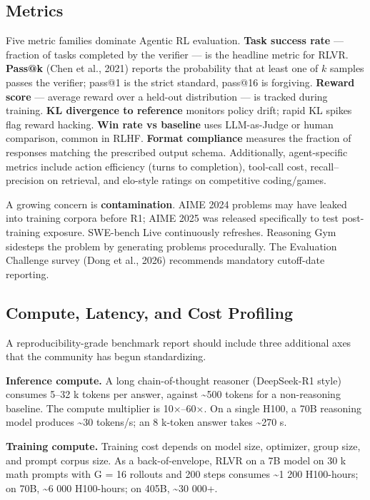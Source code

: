 \subsection{Metrics}\label{metrics}

Five metric families dominate Agentic RL evaluation. \textbf{Task success rate} --- fraction of tasks completed by the verifier --- is the headline metric for RLVR. \textbf{Pass@k} (Chen et al., 2021) reports the probability that at least one of \(k\) samples passes the verifier; pass@1 is the strict standard, pass@16 is forgiving. \textbf{Reward score} --- average reward over a held-out distribution --- is tracked during training. \textbf{KL divergence to reference} monitors policy drift; rapid KL spikes flag reward hacking. \textbf{Win rate vs baseline} uses LLM-as-Judge or human comparison, common in RLHF. \textbf{Format compliance} measures the fraction of responses matching the prescribed output schema. Additionally, agent-specific metrics include action efficiency (turns to completion), tool-call cost, recall--precision on retrieval, and elo-style ratings on competitive coding/games.

A growing concern is \textbf{contamination}. AIME 2024 problems may have leaked into training corpora before R1; AIME 2025 was released specifically to test post-training exposure. SWE-bench Live continuously refreshes. Reasoning Gym sidesteps the problem by generating problems procedurally. The Evaluation Challenge survey (Dong et al., 2026) recommends mandatory cutoff-date reporting.

\subsection{Compute, Latency, and Cost Profiling}\label{compute-latency-and-cost-profiling}

A reproducibility-grade benchmark report should include three additional axes that the community has begun standardizing.

\textbf{Inference compute.} A long chain-of-thought reasoner (DeepSeek-R1 style) consumes 5--32 k tokens per answer, against \textasciitilde500 tokens for a non-reasoning baseline. The compute multiplier is 10×--60×. On a single H100, a 70B reasoning model produces \textasciitilde30 tokens/s; an 8 k-token answer takes \textasciitilde270 s.

\textbf{Training compute.} Training cost depends on model size, optimizer, group size, and prompt corpus size. As a back-of-envelope, RLVR on a 7B model on 30 k math prompts with G = 16 rollouts and 200 steps consumes \textasciitilde1 200 H100-hours; on 70B, \textasciitilde6 000 H100-hours; on 405B, \textasciitilde30 000+.

